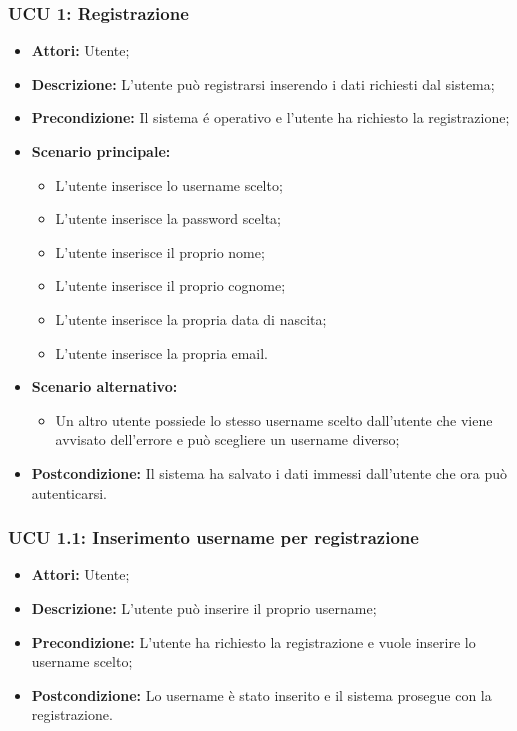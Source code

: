 \subsubsection{UCU 1: Registrazione}
\begin{itemize}
	\item \textbf{Attori:} Utente;
	\item \textbf{Descrizione:} L'utente può registrarsi inserendo i dati richiesti dal sistema;
	\item \textbf{Precondizione:} Il sistema é operativo e l'utente ha richiesto la registrazione;
	\item \textbf{Scenario principale:}
	\begin{itemize}
		\item L'utente inserisce lo username scelto;
		\item L'utente inserisce la password scelta;
		\item L'utente inserisce il proprio nome;
		\item L'utente inserisce il proprio cognome;
		\item L'utente inserisce la propria data di nascita;
		\item L'utente inserisce la propria email.
	\end{itemize}
	\item \textbf{Scenario alternativo:}
	\begin{itemize}
		\item Un altro utente possiede lo stesso username scelto dall'utente che viene avvisato dell'errore e può scegliere un username diverso;
	\end{itemize}
	\item \textbf{Postcondizione:} Il sistema ha salvato i dati immessi dall'utente che ora può autenticarsi.
\end{itemize}

\hypertarget{U1.1}{}
\subsubsection{UCU 1.1: Inserimento username per registrazione}
\begin{itemize}
	\item \textbf{Attori:} Utente;
	\item \textbf{Descrizione:} L'utente può inserire il proprio username;
	\item \textbf{Precondizione:} L'utente ha richiesto la registrazione e vuole inserire lo username scelto;
	\item \textbf{Postcondizione:} Lo username è stato inserito e il sistema prosegue con la registrazione.
\end{itemize}

